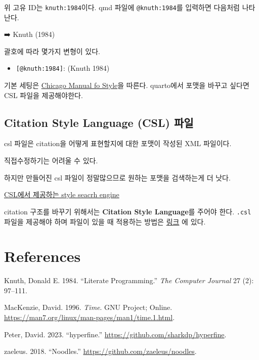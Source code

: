 \documentclass[
  letterpaper,
]{scrbook}
\providecommand{\tightlist}{%
  \setlength{\itemsep}{0pt}\setlength{\parskip}{0pt}}\usepackage{longtable,booktabs,array}
\newlength{\cslhangindent}
\newenvironment{CSLReferences}[2] %
 {\begin{list}{}{%
  \setlength{\itemindent}{0pt}
  \setlength{\leftmargin}{0pt}
  \setlength{\parsep}{0pt}
  \ifodd #1
   \setlength{\leftmargin}{\cslhangindent}
   \setlength{\itemindent}{-1\cslhangindent}
  \fi
  \setlength{\itemsep}{#2\baselineskip}}}
 {\end{list}}
\begin{document}
위 고유 ID는 \texttt{knuth:1984}이다. qmd 파일에 \texttt{@knuth:1984}를
입력하면 다음처럼 나타난다.

➡️ Knuth (1984)

괄호에 따라 몇가지 변형이 있다.

\begin{itemize}
\tightlist
\item
  \texttt{{[}@knuth:1984{]}}: (Knuth 1984)
\end{itemize}

기본 세팅은
\href{https://www.chicagomanualofstyle.org/home.html}{Chicago Manual fo
Style}을 따른다. quarto에서 포맷을 바꾸고 싶다면 CSL 파일을
제공해야한다.

\section{Citation Style Language (CSL)
파일}\label{citation-style-language-csl-uxd30cuxc77c}

csl 파일은 citation을 어떻게 표현할지에 대한 포맷이 작성된 XML 파일이다.

직접수정하기는 어려울 수 있다.

하지만 만들어진 csl 파일이 정말많으므로 원하는 포맷을 검색하는게 더
낫다.

\href{https://editor.citationstyles.org/searchByExample/}{CSL에서
제공하는 style seacrh engine}

citation 구조를 바꾸기 위해서는 \textbf{Citation Style Language}를
주어야 한다. \texttt{.csl} 파일을 제공해야 하며 파일이 있을 때 적용하는
방법은
\href{https://quarto.org/docs/authoring/citations.html\#sec-citations-style}{링크}
에 있다.


\chapter*{References}\label{references}


\label{refs}
\begin{CSLReferences}{1}{0}
Knuth, Donald E. 1984. {``Literate Programming.''} \emph{The Computer
Journal} 27 (2): 97--111.

MacKenzie, David. 1996. \emph{Time}. GNU Project; Online.
\url{https://man7.org/linux/man-pages/man1/time.1.html}.

Peter, David. 2023. {``{hyperfine}.''}
\url{https://github.com/sharkdp/hyperfine}.

zaeleus. 2018. {``Noodles.''} \url{https://github.com/zaeleus/noodles}.

\end{CSLReferences}


\backmatter
\end{document}
